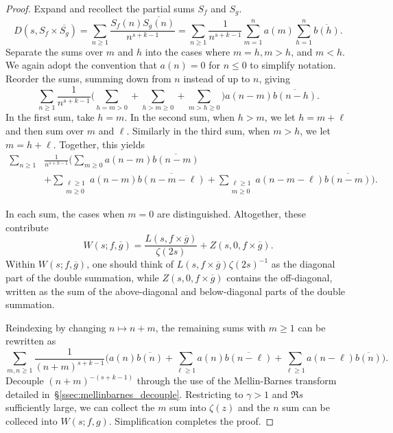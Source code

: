 \begin{proof}
  Expand and recollect the partial sums $S_f$ and $S_g$.
  \begin{equation}
    D(s, S_f \times \overline{S_g}) = \sum_{n \geq 1} \frac{S_f(n) \overline{S_g(n)}}{n^{s
    + k - 1}} = \sum_{n \geq 1} \frac{1}{n^{s + k - 1}} \sum_{m = 1}^n a(m) \sum_{h = 1}^n
    \overline{b(h)}.
  \end{equation}
  Separate the sums over $m$ and $h$ into the cases where $m=h, m>h$, and $m<h$.
  We again adopt the convention that $a(n) = 0$ for $n \leq 0$ to simplify notation.
  Reorder the sums, summing down from $n$ instead of up to $n$, giving
  \begin{equation}
    \sum_{n \geq 1} \frac{1}{n^{s + k - 1}} \Bigg( \sum_{h = m > 0} + \sum_{h > m \geq 0}
    + \sum_{m > h \geq 0}\Bigg) a(n-m) \overline{b(n-h)}.
  \end{equation}
  In the first sum, take $h = m$.
  In the second sum, when $h > m$, we let $h = m + \ell$ and then sum over $m$ and $\ell$.
  Similarly in the third sum, when $m > h$, we let $m = h + \ell$.
  Together, this yields
  \begin{equation}
    \begin{split}
      \sum_{n \geq 1} &\frac{1}{n^{s + k - 1}} \bigg( \sum_{m \geq 0} a(n-m)
      \overline{b(n-m)} \\
      &+ \sum_{\substack{\ell \geq 1 \\ m \geq 0}} a(n-m) \overline{b(n-m-\ell)} +
    \sum_{\substack{\ell \geq 1 \\ m \geq 0}} a(n-m-\ell)\overline{b(n-m)}\bigg).
    \end{split}
  \end{equation}


  In each sum, the cases when $m = 0$ are distinguished.
  Altogether, these contribute
  \begin{equation}
    W(s; f,\overline{g}) = \frac{L(s, f\times \overline{g})}{\zeta(2s)} + Z(s, 0, f\times
    \overline{g}).
  \end{equation}
  Within $W(s; f, \overline{g})$, one should think of $L(s, f\times
  \overline{g})\zeta(2s)^{-1}$ as the diagonal part of the double summation, while
  $Z(s, 0, f\times \overline{g})$ contains the off-diagonal, written as the sum of the
  above-diagonal and below-diagonal parts of the double summation.


  Reindexing by changing $n \mapsto n + m$, the remaining sums with $m \geq 1$ can be rewritten as
  \begin{equation}
    \sum_{m,n \geq 1} \frac{1}{(n+m)^{s + k - 1}}\bigg( a(n) \overline{b(n)} + \sum_{\ell
    \geq 1} a(n) \overline{b(n - \ell)} + \sum_{\ell \geq 1} a(n - \ell)
  \overline{b(n)}\bigg).
  \end{equation}
  Decouple $(n+m)^{-(s + k - 1)}$ through the use of the Mellin-Barnes transform detailed
  in~\S\ref{ssec:mellinbarnes_decouple}.
  Restricting to $\gamma > 1$ and $\Re s$ sufficiently large, we can collect the $m$ sum
  into $\zeta(z)$ and the $n$ sum can be colleced into $W(s; f,g)$.
  Simplification completes the proof.
\end{proof}


